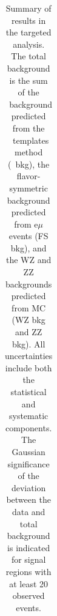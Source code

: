 \begin{table}[htb]
\begin{center}
\footnotesize
\caption{\label{tab:results_targ}\footnotesize Summary of results in the targeted analysis. The total background is the sum of the \zjets\ background predicted from
the \MET\ templates method (\zjets\ bkg), the flavor-symmetric background predicted from e$\mu$ events (FS bkg), and the WZ and ZZ backgrounds predicted from MC
(WZ bkg and ZZ bkg). All uncertainties include both the statistical and systematic components. The Gaussian significance of the deviation between the data 
and total background is indicated for signal regions with at least 20 observed events. }
\begin{tabular}{l|c|c|c|c}





\end{tabular}
\end{center}
\end{table}
